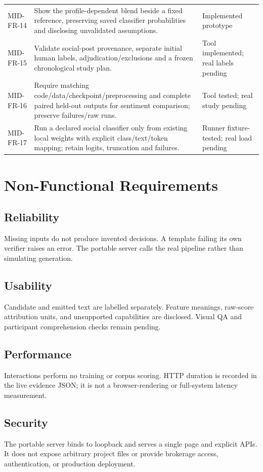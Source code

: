 \begin{longtable}{p{}p{}p{}}
MID-FR-14 & Show the profile-dependent blend beside a fixed reference, preserving saved classifier probabilities and disclosing unvalidated assumptions. & Implemented prototype\\
MID-FR-15 & Validate social-post provenance, separate initial human labels, adjudication/exclusions and a frozen chronological study plan. & Tool implemented; real labels pending\\
MID-FR-16 & Require matching code/data/checkpoint/preprocessing and complete paired held-out outputs for sentiment comparison; preserve failures/raw runs. & Tool tested; real study pending\\
MID-FR-17 & Run a declared social classifier only from existing local weights with explicit class/text/token mapping; retain logits, truncation and failures. & Runner fixture-tested; real load pending\\
\bottomrule
\end{longtable}
\section{Non-Functional Requirements}
\subsection{Reliability}
Missing inputs do not produce invented decisions. A template failing its own verifier raises an error. The portable server calls the real pipeline rather than simulating generation.
\subsection{Usability}
Candidate and emitted text are labelled separately. Feature meanings, raw-score attribution units, and unsupported capabilities are disclosed. Visual QA and participant comprehension checks remain pending.
\subsection{Performance}
Interactions perform no training or corpus scoring. HTTP duration is recorded in the live evidence JSON; it is not a browser-rendering or full-system latency measurement.
\subsection{Security}
The portable server binds to loopback and serves a single page and explicit APIs. It does not expose arbitrary project files or provide brokerage access, authentication, or production deployment.
